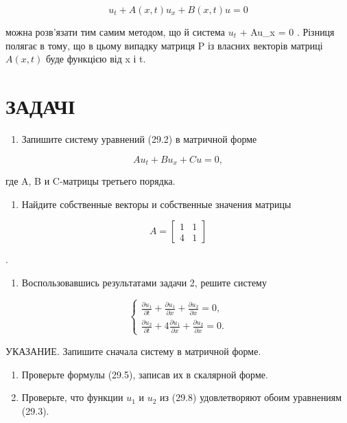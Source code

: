 \documentclass[
  ukrainian,
]{article}
\providecommand{\tightlist}{%
  \setlength{\itemsep}{0pt}\setlength{\parskip}{0pt}}
\begin{document}
\[
u_t + A(x, t) u_x + B(x, t) u = 0
\]

можна розв'язати тим самим методом, що й система \(u_t\) + Au\_x = 0 .
Різниця полягає в тому, що в цьому випадку матриця P із власних векторів
матриці \(A(x, t)\) буде функцією від x і t.

\section{ЗАДАЧІ}\label{ux437ux430ux434ux430ux447ux456}

\begin{enumerate}
\def\labelenumi{\arabic{enumi}.}
\tightlist
\item
  Запишите систему уравнений (29.2) в матричной форме
\end{enumerate}

\[
Au_t + Bu_x + Cu = 0,
\]

где A, B и C-матрицы третьего порядка.

\begin{enumerate}
\def\labelenumi{\arabic{enumi}.}
\setcounter{enumi}{1}
\tightlist
\item
  Найдите собственные векторы и собственные значения матрицы
\end{enumerate}

\[
A =
\begin{bmatrix} 1 & 1 \\ 4 & 1 \end{bmatrix}
\]

.

\begin{enumerate}
\def\labelenumi{\arabic{enumi}.}
\setcounter{enumi}{2}
\tightlist
\item
  Воспользовавшись результатами задачи 2, решите систему
\end{enumerate}

\[
\begin{cases} \frac{\partial u_1}{\partial t} + \frac{\partial u_1}{\partial x} + \frac{\partial u_2}{\partial x} = 0, \\ \frac{\partial u_2}{\partial t} + 4 \frac{\partial u_1}{\partial x} + \frac{\partial u_2}{\partial x} = 0. \end{cases}
\]

УКАЗАНИЕ. Запишите сначала систему в матричной форме.

\begin{enumerate}
\def\labelenumi{\arabic{enumi}.}
\setcounter{enumi}{3}
\item
  Проверьте формулы (29.5), записав их в скалярной форме.
\item
  Проверьте, что функции \(u_1\) и \(u_2\) из (29.8) удовлетворяют обоим
  уравнениям (29.3).
\end{enumerate}
\end{document}
